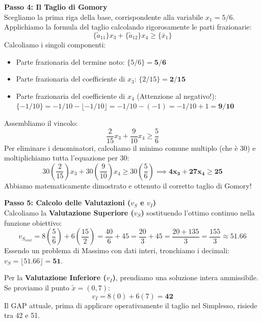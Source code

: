 \documentclass[12pt, a4paper]{article}
\newcommand{\separatore}{\noindent{\color{titlecolor!50}\rule{\textwidth}{0.6pt}}}
\begin{document}
	\vspace{0.4cm}
	\textbf{Passo 4: Il Taglio di Gomory}\\
	Scegliamo la prima riga della base, corrispondente alla variabile $x_1 = 5/6$.
	Applichiamo la formula del taglio calcolando rigorosamente le parti frazionarie:
	\[
	\{\tilde{a}_{11}\} x_3 + \{\tilde{a}_{12}\} x_4 \geq \{\bar{x}_1\}
	\]
	Calcoliamo i singoli componenti:
	\begin{itemize}[label=$\circ$, itemsep=2pt, leftmargin=1.5cm]
		\item Parte frazionaria del termine noto: $\{5/6\} = \mathbf{5/6}$
		\item Parte frazionaria del coefficiente di $x_3$: $\{2/15\} = \mathbf{2/15}$
		\item Parte frazionaria del coefficiente di $x_4$ (Attenzione al negativo!): \\ 
		$\{-1/10\} = -1/10 - \lfloor -1/10 \rfloor = -1/10 - (-1) = -1/10 + 1 = \mathbf{9/10}$
	\end{itemize}
	Assembliamo il vincolo:
	\[
	\frac{2}{15} x_3 + \frac{9}{10} x_4 \geq \frac{5}{6}
	\]
	Per eliminare i denominatori, calcoliamo il minimo comune multiplo (che è $30$) e moltiplichiamo tutta l'equazione per 30:
	\[
	30 \left( \frac{2}{15} \right) x_3 + 30 \left( \frac{9}{10} \right) x_4 \geq 30 \left( \frac{5}{6} \right) \implies \mathbf{4x_3 + 27x_4 \geq 25}
	\]
	Abbiamo matematicamente dimostrato e ottenuto il corretto taglio di Gomory!
	
	\vspace{0.4cm}
	\textbf{Passo 5: Calcolo delle Valutazioni ($v_S$ e $v_I$)}\\
	Calcoliamo la \textbf{Valutazione Superiore ($v_S$)} sostituendo l'ottimo continuo nella funzione obiettivo:
	\[
	v_{S_{cont}} = 8\left(\frac{5}{6}\right) + 6\left(\frac{15}{2}\right) = \frac{40}{6} + 45 = \frac{20}{3} + 45 = \frac{20 + 135}{3} = \frac{155}{3} \approx 51.66
	\]
	Essendo un problema di Massimo con dati interi, tronchiamo i decimali: $v_S = \lfloor 51.66 \rfloor = \mathbf{51}$.
	
	Per la \textbf{Valutazione Inferiore ($v_I$)}, prendiamo una soluzione intera ammissibile. Se proviamo il punto $\tilde{x} = (0, 7)$:
	\[
	v_I = 8(0) + 6(7) = \mathbf{42}
	\]
	Il GAP attuale, prima di applicare operativamente il taglio nel Simplesso, risiede tra 42 e 51.
	
	\vspace{0.6cm}
	\separatore
	\vspace{0.4cm}
	
\end{document}
